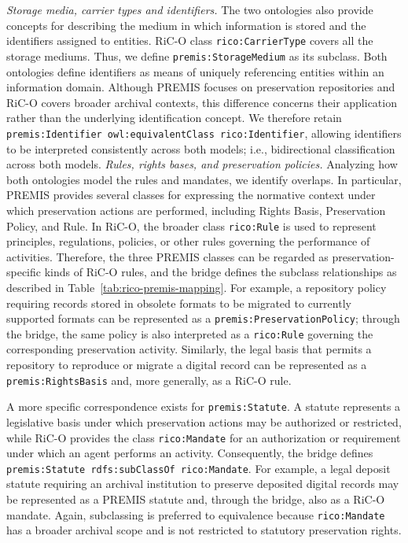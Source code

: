 \documentclass[runningheads]{llncs}
\begin{document}
\emph{Storage media, carrier types and identifiers.}
The two ontologies also provide concepts for describing the medium in which
information is stored and the identifiers assigned to entities. RiC-O class \texttt{rico:CarrierType} covers all the storage mediums. Thus, we define \texttt{premis:StorageMedium} as its subclass. 
Both ontologies define identifiers as means of uniquely referencing entities within an information domain. Although PREMIS focuses on preservation repositories and RiC-O covers broader archival contexts, this difference concerns their application rather than the underlying identification concept. We therefore retain \texttt{premis:Identifier owl:equivalentClass rico:Identifier}, allowing identifiers to be interpreted consistently across both models; i.e., bidirectional classification across both models.
\emph{Rules, rights bases, and preservation policies.} Analyzing how both ontologies model the rules and mandates, we identify overlaps. In particular, PREMIS provides several classes for expressing the
normative context under which preservation actions are performed, including
Rights Basis, Preservation Policy, and Rule. In RiC-O, the broader class \texttt{rico:Rule} is used
to represent principles, regulations, policies, or other rules governing the
performance of activities. Therefore, the three PREMIS classes can be regarded as
preservation-specific kinds of RiC-O rules, and the bridge defines the subclass relationships as described in Table~\ref{tab:rico-premis-mapping}.
%
For example, a repository policy requiring records stored in obsolete formats
to be migrated to currently supported formats can be represented as a
\texttt{premis:PreservationPolicy}; through the bridge, the same policy is also
interpreted as a \texttt{rico:Rule} governing the corresponding preservation
activity. Similarly, the legal basis that permits a repository to reproduce or
migrate a digital record can be represented as a
\texttt{premis:RightsBasis} and, more generally, as a RiC-O rule.

A more specific correspondence exists for \texttt{premis:Statute}. A statute
represents a legislative basis under which preservation actions may be
authorized or restricted, while RiC-O provides the class
\texttt{rico:Mandate} for an authorization or requirement under which an agent
performs an activity. Consequently, the bridge defines
\texttt{premis:Statute rdfs:subClassOf rico:Mandate}. For example, a legal
deposit statute requiring an archival institution to preserve deposited digital
records may be represented as a PREMIS statute and, through the bridge, also as
a RiC-O mandate. Again, subclassing is preferred to equivalence because
\texttt{rico:Mandate} has a broader archival scope and is not restricted to
statutory preservation rights.
\end{document}

